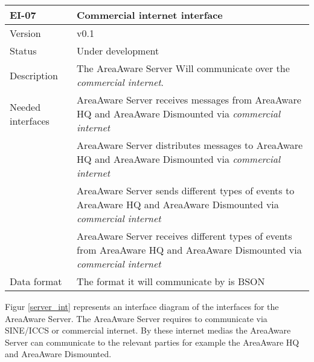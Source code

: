 \begin{longtable}{| p{3.5cm} |  p{10cm} | }
	\hline
	\textbf{EI-07} &  \textbf{Commercial internet interface} \\
	\hline
	Version & v0.1 \\
	\hline
	Status & Under development \\
	\hline
	Description & The AreaAware Server Will communicate over the \emph{commercial internet}.
	\\
	\hline
	Needed interfaces 
	& AreaAware Server receives messages from AreaAware HQ and AreaAware Dismounted via \emph{commercial internet} \\
	& AreaAware Server distributes messages to AreaAware HQ and AreaAware Dismounted via \emph{commercial internet} \\ 
	& AreaAware Server sends different types of events to AreaAware HQ and AreaAware Dismounted via \emph{commercial internet} \\
	& AreaAware Server receives different types of events from AreaAware HQ and AreaAware Dismounted via \emph{commercial internet} \\
	\hline
	Data format
	& The format it will communicate by is BSON \\
	\hline
\end{longtable}


Figur \ref{server_int} represents an interface diagram of the interfaces for the AreaAware Server. The AreaAware Server requires to communicate via SINE/ICCS or commercial internet. By these internet medias the AreaAware Server can communicate to the relevant parties for example the AreaAware HQ and AreaAware Dismounted.
